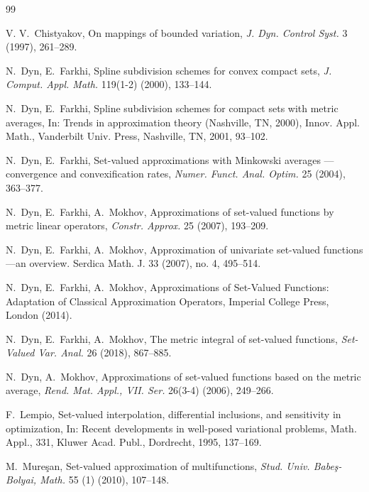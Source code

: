 \documentclass[final,3p,mathptmx]{article}%
\begin{document}
{{{\begin{thebibliography}{99}
%

V. V.~Chistyakov,
On mappings of bounded variation, 
\textit {J. Dyn. Control Syst.} 3 (1997), 261--289.
%



N.~Dyn, E.~Farkhi, 
Spline subdivision schemes for convex compact sets,
\textit{J. Comput. Appl. Math.} 119(1-2) (2000), 133--144.
%

N.~Dyn, E.~Farkhi,  
Spline subdivision schemes for compact sets with metric averages, 
In: Trends in approximation theory (Nashville, TN, 2000), Innov. Appl. Math., 
Vanderbilt Univ. Press, Nashville, TN, 2001, 93--102.
%

N.~Dyn, E.~Farkhi,
Set-valued approximations with Minkowski averages --- convergence and convexification rates,
\textit{Numer. Funct. Anal. Optim.} 25 (2004), 363--377.
%

N.~Dyn, E.~Farkhi, A.~Mokhov,
Approximations of set-valued functions by metric linear operators,
\textit{Constr. Approx.} 25 (2007), 193--209.
%

 N.~Dyn, E.~Farkhi, A.~Mokhov, 
Approximation of univariate set-valued functions—an overview. 
Serdica Math. J. 33 (2007), no. 4, 495–514.

N.~Dyn, E.~Farkhi, A.~Mokhov,
Approximations of Set-Valued Functions: Adaptation of Classical Approximation Operators,
Imperial College Press, London (2014).
%

N.~Dyn, E.~Farkhi, A.~Mokhov,
The metric integral of set-valued functions, 
\textit{Set-Valued Var. Anal.} 26 (2018), 867--885.
%

N.~Dyn, A.~Mokhov, 
Approximations of set-valued functions based on the metric average, 
\textit{Rend. Mat. Appl., VII. Ser.} 26(3-4)  (2006), 249--266.
%



 F.~Lempio, 
 Set-valued interpolation, differential inclusions, and sensitivity in optimization,
In: Recent developments in well-posed variational problems, Math. Appl., 331, 
Kluwer Acad. Publ., Dordrecht, 1995, 137--169.
%

M.~Mure\c{s}an, 
Set-valued approximation of multifunctions, 
\textit{Stud. Univ. Babe\c{s}-Bolyai, Math.}
55 (1) (2010), 107--148.
% 


\end{thebibliography}}}}
\end{document}
